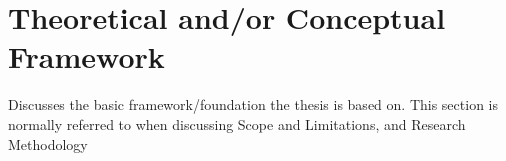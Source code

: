 %
%
%                 

\chapter{Theoretical and/or Conceptual Framework}
\label{sec:appendixb}

Discusses the basic framework/foundation the thesis is based on. This section is normally referred to when discussing Scope and Limitations,
and Research Methodology


